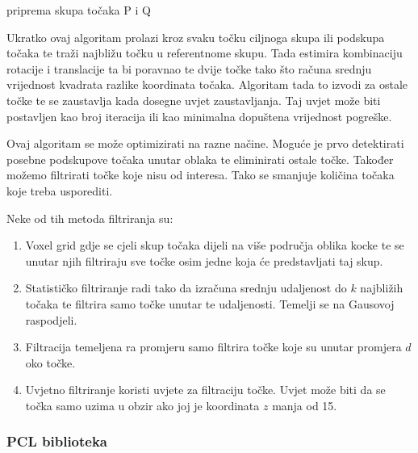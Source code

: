 \begin{algorithm}[h!]
\SetAlgoLined
{}
 priprema skupa točaka P i Q\;
\end{algorithm}

Ukratko ovaj algoritam prolazi kroz svaku točku ciljnoga skupa ili podskupa točaka te traži najbližu točku u referentnome skupu. Tada estimira kombinaciju rotacije i translacije ta bi poravnao te dvije točke tako što računa srednju vrijednost kvadrata razlike koordinata točaka. Algoritam tada to izvodi za ostale točke te se zaustavlja kada dosegne uvjet zaustavljanja. Taj uvjet može biti postavljen kao broj iteracija ili kao minimalna dopuštena vrijednost pogreške.

Ovaj algoritam se može optimizirati na razne načine. Moguće je prvo detektirati posebne podskupove točaka unutar oblaka te eliminirati ostale točke. Također možemo filtrirati točke koje nisu od interesa. Tako se smanjuje količina točaka koje treba usporediti.

Neke od tih metoda filtriranja su:
\begin{enumerate}
  \item Voxel grid gdje se cjeli skup točaka dijeli na više područja oblika kocke te se unutar njih filtriraju sve točke osim jedne koja će predstavljati taj skup.
  \item Statističko filtriranje radi tako da izračuna srednju udaljenost do $k$ najbližih točaka te filtrira samo točke unutar te udaljenosti. Temelji se na Gausovoj raspodjeli.
  \item Filtracija temeljena ra promjeru samo filtrira točke koje su unutar promjera $d$ oko točke.
  \item Uvjetno filtriranje koristi uvjete za filtraciju točke. Uvjet može biti da se točka samo uzima u obzir ako joj je koordinata $z$ manja od 15.
\end{enumerate}

\pagebreak
\subsubsection{PCL biblioteka}

